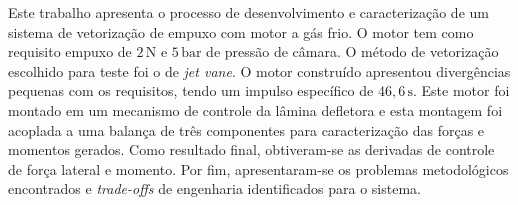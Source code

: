 Este trabalho apresenta o processo de desenvolvimento e caracterização de um sistema de vetorização de empuxo com motor a gás frio. O motor tem como requisito empuxo de \(2\,\mathrm{N}\) e \(5\,\mathrm{bar}\) de pressão de câmara. O método de vetorização escolhido para teste foi o de \textit{jet vane}. O motor construído apresentou divergências pequenas com os requisitos, tendo um impulso específico de \(46,6\,\mathrm{s}\). Este motor foi montado em um mecanismo de controle da lâmina defletora e esta montagem foi acoplada a uma balança de três componentes para caracterização das forças e momentos gerados. Como resultado final, obtiveram-se as derivadas de controle de força lateral e momento. Por fim, apresentaram-se os problemas metodológicos encontrados e \textit{trade-offs} de engenharia identificados para o sistema.